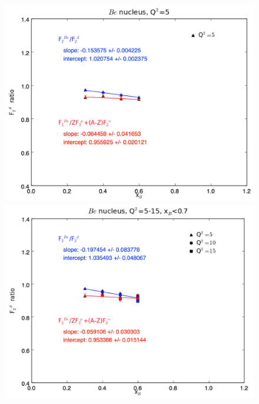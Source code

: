 \documentclass[oneside]{article}
\begin{document}
 \begin{figure}[H]
\begin{minipage}{0.5\textwidth}
 \includegraphics[width=\textwidth]{plots/q2_5/q2_5_Be.png}
\end{minipage}\hfill\begin{minipage}{0.5\textwidth}
\includegraphics[width=\textwidth]{plots/q2_all_x_l7/q2_all_x_l7_Be.png}
\end{minipage}\hfill\begin{minipage}{0.5\textwidth}

\end{minipage}
\end{figure}
\end{document}
